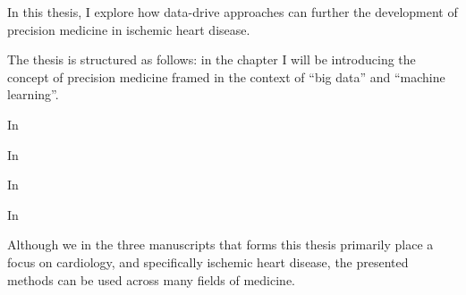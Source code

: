 In this thesis, I explore how data-drive approaches
can further the development of precision medicine in ischemic heart disease.

The thesis is structured as follows:
in the chapter  I will be introducing the 
concept of precision medicine framed in the context of \enquote{big data}
and \enquote{machine learning}.

In 

In 

In 

In 




Although we in the three manuscripts that forms this thesis 
primarily place a focus on cardiology,
and specifically ischemic heart disease,
the presented methods can be used across many fields of medicine.



